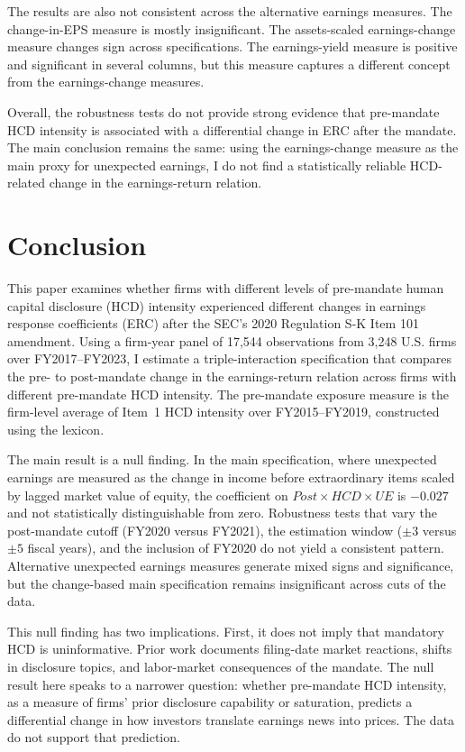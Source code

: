 \documentclass[12pt]{article}
\begin{document}
{The results are also not consistent across the alternative earnings measures. The change-in-EPS measure is mostly insignificant. The assets-scaled earnings-change measure changes sign across specifications. The earnings-yield measure is positive and significant in several columns, but this measure captures a different concept from the earnings-change measures.

Overall, the robustness tests do not provide strong evidence that pre-mandate HCD intensity is associated with a differential change in ERC after the mandate. The main conclusion remains the same: using the earnings-change measure as the main proxy for unexpected earnings, I do not find a statistically reliable HCD-related change in the earnings-return relation.}


\section{Conclusion}

This paper examines whether firms with different levels of pre-mandate human capital disclosure (HCD) intensity experienced different changes in earnings response coefficients (ERC) after the SEC's 2020 Regulation S-K Item 101 amendment. Using a firm-year panel of 17,544 observations from 3,248 U.S. firms over FY2017--FY2023, I estimate a triple-interaction specification that compares the pre- to post-mandate change in the earnings-return relation across firms with different pre-mandate HCD intensity. The pre-mandate exposure measure is the firm-level average of Item~1 HCD intensity over FY2015--FY2019, constructed using the \citet{demers_al2024} lexicon.

The main result is a null finding. In the main specification, where unexpected earnings are measured as the change in income before extraordinary items scaled by lagged market value of equity, the coefficient on $Post \times HCD \times UE$ is $-0.027$ and not statistically distinguishable from zero. Robustness tests that vary the post-mandate cutoff (FY2020 versus FY2021), the estimation window ($\pm 3$ versus $\pm 5$ fiscal years), and the inclusion of FY2020 do not yield a consistent pattern. Alternative unexpected earnings measures generate mixed signs and significance, but the change-based main specification remains insignificant across cuts of the data.

This null finding has two implications. First, it does not imply that mandatory HCD is uninformative. Prior work documents filing-date market reactions, shifts in disclosure topics, and labor-market consequences of the mandate. The null result here speaks to a narrower question: whether pre-mandate HCD intensity, as a measure of firms' prior disclosure capability or saturation, predicts a differential change in how investors translate earnings news into prices. The data do not support that prediction.
\end{document}
